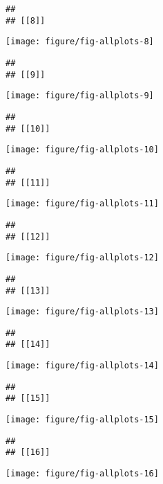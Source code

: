 \documentclass[a4]{article}\usepackage[]{graphicx}\usepackage[]{color}
\makeatletter
\def\maxwidth{ %
  \ifdim\Gin@nat@width>\linewidth
    \linewidth
  \else
    \Gin@nat@width
  \fi
}
\newenvironment{kframe}{%
 \def\at@end@of@kframe{}%
 \ifinner\ifhmode%
  \def\at@end@of@kframe{\end{minipage}}%
  \begin{minipage}{\columnwidth}%
 \fi\fi%
 \def\FrameCommand##1{\hskip\@totalleftmargin \hskip-\fboxsep
 \colorbox{shadecolor}{##1}\hskip-\fboxsep
     \hskip-\linewidth \hskip-\@totalleftmargin \hskip\columnwidth}%
 \MakeFramed {\advance\hsize-\width
   \@totalleftmargin\z@ \linewidth\hsize
   \@setminipage}}%
 {\par\unskip\endMakeFramed%
 \at@end@of@kframe}
\newenvironment{knitrout}{}{} %
\makeatother
\begin{document}
\begin{knitrout}
\begin{kframe}
\begin{verbatim}
## 
## [[8]]
\end{verbatim}
\end{kframe}
\texttt{[image: figure/fig-allplots-8]} 
\begin{kframe}\begin{verbatim}
## 
## [[9]]
\end{verbatim}
\end{kframe}
\texttt{[image: figure/fig-allplots-9]} 
\begin{kframe}\begin{verbatim}
## 
## [[10]]
\end{verbatim}
\end{kframe}
\texttt{[image: figure/fig-allplots-10]} 
\begin{kframe}\begin{verbatim}
## 
## [[11]]
\end{verbatim}
\end{kframe}
\texttt{[image: figure/fig-allplots-11]} 
\begin{kframe}\begin{verbatim}
## 
## [[12]]
\end{verbatim}
\end{kframe}
\texttt{[image: figure/fig-allplots-12]} 
\begin{kframe}\begin{verbatim}
## 
## [[13]]
\end{verbatim}
\end{kframe}
\texttt{[image: figure/fig-allplots-13]} 
\begin{kframe}\begin{verbatim}
## 
## [[14]]
\end{verbatim}
\end{kframe}
\texttt{[image: figure/fig-allplots-14]} 
\begin{kframe}\begin{verbatim}
## 
## [[15]]
\end{verbatim}
\end{kframe}
\texttt{[image: figure/fig-allplots-15]} 
\begin{kframe}\begin{verbatim}
## 
## [[16]]
\end{verbatim}
\end{kframe}
\texttt{[image: figure/fig-allplots-16]} 
\begin{kframe}\begin{verbatim}

\end{verbatim}
\end{kframe}
\end{knitrout}
\end{document}
